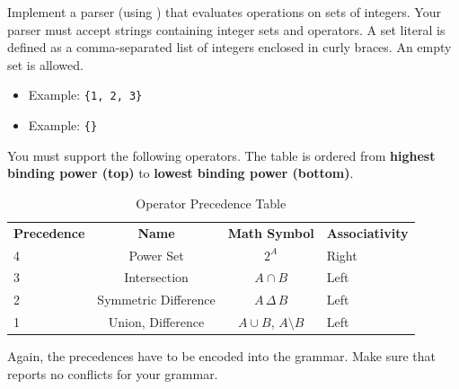 \exerciseEng
Implement a parser (using ) that evaluates operations on sets of integers.
Your parser must accept strings containing integer sets and operators.
A set literal is defined as a comma-separated list of integers enclosed in curly braces.
An empty set is allowed.
\begin{itemize}
    \item Example: \texttt{\{1, 2, 3\}}
    \item Example: \texttt{\{\}}
\end{itemize}
You must support the following operators. The table is ordered from \textbf{highest binding power (top)} to \textbf{lowest binding power (bottom)}.

\begin{table}[h]
\centering
\begin{tabular}{lccl}

  \textbf{Precedence} & \textbf{Name} & \textbf{Math Symbol} & \textbf{Associativity} \\ 
4 & Power Set    &  $2^A$ & Right \\
3 & Intersection &  $A \cap B$ & Left \\
2 & Symmetric Difference & $A \,\Delta\, B$ & Left \\
1 & Union, Difference   & $A \cup B$, $A \setminus B$ & Left \\ 
\end{tabular}
\caption{Operator Precedence Table}
\label{tab:set_ops}
\end{table}

\noindent
Again, the precedences have to be encoded into the grammar.  Make sure that  reports no
conflicts for your grammar.

